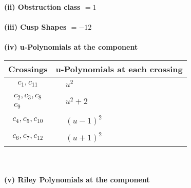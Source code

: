 \documentclass[1p]{elsarticle_modified}
\theoremstyle{definition}
\begin{document}
\flushleft \textbf{(ii) Obstruction class $= 1$}\\~\\
\flushleft \textbf{(iii) Cusp Shapes $= -12$}\\~\\
\newpage\renewcommand{\arraystretch}{1}
\flushleft \textbf{(iv) u-Polynomials at the component}\newline \\
\begin{tabular}{m{50pt}|m{274pt}}
Crossings & \hspace{64pt}u-Polynomials at each crossing \\
\hline $$\begin{aligned}c_{1},c_{11}\end{aligned}$$&$\begin{aligned}
&u^2
\end{aligned}$\\
\hline $$\begin{aligned}c_{2},c_{3},c_{8}\\c_{9}\end{aligned}$$&$\begin{aligned}
&u^2+2
\end{aligned}$\\
\hline $$\begin{aligned}c_{4},c_{5},c_{10}\end{aligned}$$&$\begin{aligned}
&(u-1)^2
\end{aligned}$\\
\hline $$\begin{aligned}c_{6},c_{7},c_{12}\end{aligned}$$&$\begin{aligned}
&(u+1)^2
\end{aligned}$\\
\hline
\end{tabular}\\~\\
\newpage\renewcommand{\arraystretch}{1}
\flushleft \textbf{(v) Riley Polynomials at the component}\newline \\
\end{document}
